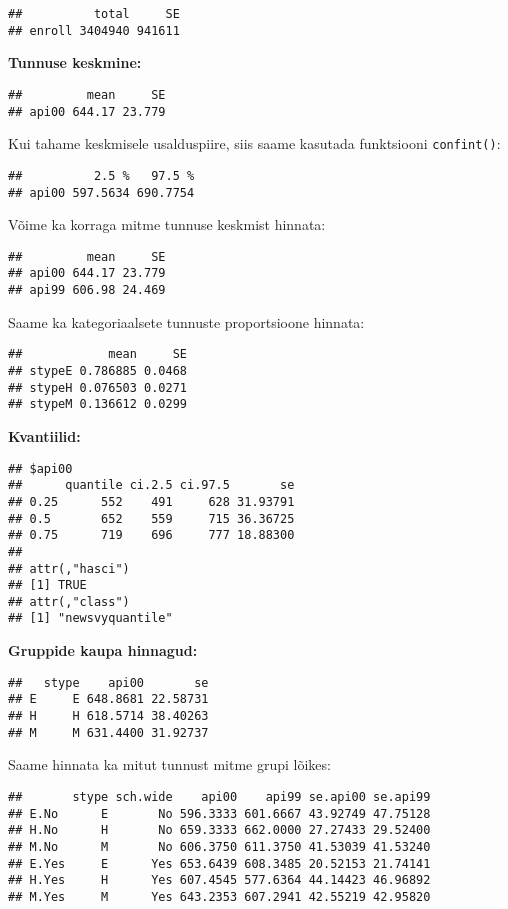 \documentclass[
]{book}
\begin{document}
\begin{verbatim}
##          total     SE
## enroll 3404940 941611
\end{verbatim}

\textbf{Tunnuse keskmine:}

\begin{verbatim}
##         mean     SE
## api00 644.17 23.779
\end{verbatim}

Kui tahame keskmisele usalduspiire, siis saame kasutada funktsiooni \texttt{confint()}:

\begin{verbatim}
##          2.5 %   97.5 %
## api00 597.5634 690.7754
\end{verbatim}

Võime ka korraga mitme tunnuse keskmist hinnata:

\begin{verbatim}
##         mean     SE
## api00 644.17 23.779
## api99 606.98 24.469
\end{verbatim}

Saame ka kategoriaalsete tunnuste proportsioone hinnata:

\begin{verbatim}
##            mean     SE
## stypeE 0.786885 0.0468
## stypeH 0.076503 0.0271
## stypeM 0.136612 0.0299
\end{verbatim}

\textbf{Kvantiilid:}

\begin{verbatim}
## $api00
##      quantile ci.2.5 ci.97.5       se
## 0.25      552    491     628 31.93791
## 0.5       652    559     715 36.36725
## 0.75      719    696     777 18.88300
## 
## attr(,"hasci")
## [1] TRUE
## attr(,"class")
## [1] "newsvyquantile"
\end{verbatim}

\textbf{Gruppide kaupa hinnagud:}

\begin{verbatim}
##   stype    api00       se
## E     E 648.8681 22.58731
## H     H 618.5714 38.40263
## M     M 631.4400 31.92737
\end{verbatim}

Saame hinnata ka mitut tunnust mitme grupi lõikes:

\begin{verbatim}
##       stype sch.wide    api00    api99 se.api00 se.api99
## E.No      E       No 596.3333 601.6667 43.92749 47.75128
## H.No      H       No 659.3333 662.0000 27.27433 29.52400
## M.No      M       No 606.3750 611.3750 41.53039 41.53240
## E.Yes     E      Yes 653.6439 608.3485 20.52153 21.74141
## H.Yes     H      Yes 607.4545 577.6364 44.14423 46.96892
## M.Yes     M      Yes 643.2353 607.2941 42.55219 42.95820
\end{verbatim}
\end{document}
